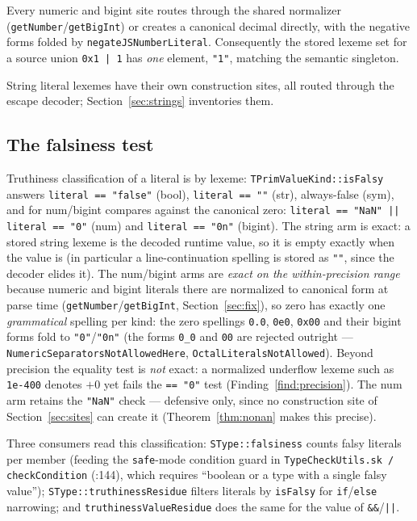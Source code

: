 \documentclass[11pt]{article}
\begin{document}
Every numeric and bigint site routes through the shared normalizer
(\texttt{getNumber}/\texttt{getBigInt}) or creates a canonical decimal
directly, with the negative forms folded by
\texttt{negateJSNumberLiteral}. Consequently the stored lexeme set for
a source union \texttt{0x1 | 1} has \emph{one} element, \texttt{"1"},
matching the semantic singleton.

String literal lexemes have their own construction sites, all routed
through the escape decoder; Section~\ref{sec:strings} inventories them.

\subsection{The falsiness test}
\label{sec:falsiness}

Truthiness classification of a literal is by lexeme:
\texttt{TPrimValueKind::isFalsy} answers \texttt{literal == "false"}
(bool), \texttt{literal == ""} (str), always-false (sym), and for
num/bigint compares against the canonical zero:
\texttt{literal == "NaN" || literal == "0"} (num) and
\texttt{literal == "0n"} (bigint). The string arm is exact: a stored
string lexeme is the decoded runtime value, so it is empty exactly when
the value is (in particular a line-continuation spelling is stored as
\texttt{""}, since the decoder elides it). The num/bigint arms are
\emph{exact on the within-precision range} because numeric and bigint
literals there are normalized to canonical form at parse time
(\texttt{getNumber}/\texttt{getBigInt}, Section~\ref{sec:fix}), so zero
has exactly one \emph{grammatical} spelling per kind: the zero spellings
\texttt{0.0}, \texttt{0e0}, \texttt{0x00} and their bigint forms fold to
\texttt{"0"}/\texttt{"0n"} (the forms \texttt{0\_0} and \texttt{00} are
rejected outright --- \texttt{NumericSeparatorsNotAllowedHere},
\texttt{OctalLiteralsNotAllowed}). Beyond precision the equality test is
\emph{not} exact: a normalized underflow lexeme such as \texttt{1e-400}
denotes $+0$ yet fails the \texttt{== "0"} test
(Finding~\ref{find:precision}). The num arm retains the \texttt{"NaN"}
check --- defensive only, since no construction site of
Section~\ref{sec:sites} can create it (Theorem~\ref{thm:nonan} makes this
precise).

Three consumers read this classification:
\texttt{SType::falsiness} counts falsy literals per member
(feeding the \texttt{safe}-mode condition guard in
\texttt{TypeCheckUtils.sk / checkCondition} (:144), which requires
``boolean or a type with a single falsy value'');
\texttt{SType::truthinessResidue} filters literals by
\texttt{isFalsy} for \texttt{if}/\texttt{else} narrowing; and
\texttt{truthinessValueResidue} does the same for the value of
\texttt{\&\&}/\texttt{||}.
\end{document}
